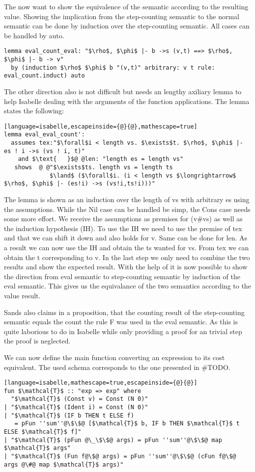 The now want to show the equivalence of the semantic according to the resulting value. Showing the implication from the step-counting semantic to the normal semantic can be done by induction over the step-counting semantic. All cases can be handled by auto.
\begin{lstlisting}[language=isabelle,mathescape=true]
  lemma eval_count_eval: "$\rho$, $\phi$ |- b ->s (v,t) ==> $\rho$, $\phi$ |- b -> v"
  by (induction $\rho$ $\phi$ b "(v,t)" arbitrary: v t rule: eval_count.induct) auto
\end{lstlisting}

The other direction also is not difficult but needs an lengthy axiliary lemma to help Isabelle dealing with the arguments of the function applications. The lemma states the following:
\begin{lstlisting}[language=isabelle,escapeinside={@}{@},mathescape=true]
lemma eval_eval_count':
  assumes tex:"$\forall$i < length vs. $\exists$t. $\rho$, $\phi$ |- es ! i ->s (vs ! i, t)"
    and $\text{   }$@ @len: "length es = length vs"
   shows  @ @"$\exists$ts. length vs = length ts
             $\land$ ($\forall$i. (i < length vs $\longrightarrow$ $\rho$, $\phi$ |- (es!i) ->s (vs!i,ts!i)))"
\end{lstlisting}

The lemma is shown as an induction over the length of vs with arbitrary es using the assumptions.
While the Nil case can be handled be simp, the Cons case needs some more effort.
We receive the assumptions as premises for (v\#vs) as well as the induction hypothesis (IH).
To use the IH we need to use the premise of tex and that we can shift it down and also holds for v. Same can be done for len.
As a result we can now use the IH and obtain the ts wanted for vs.
From tex we can obtain the t corresponding to v.
In the last step we only need to combine the two results and show the expected result. With the help of it is now possible to show the direction from eval semantic to step-counting semantic by induction of the eval semantic. This gives us the equivalance of the two semantics according to the value result.

Sands also claims in a proposition, that the counting result of the step-counting semantic equals the count the rule F was used in the eval semantic.
As this is quite laborious to do in Isabelle while only providing a proof for an trivial step the proof is neglected.

We can now define the main function converting an expression to its cost equivalent. The used schema corresponds to the one presented in \#TODO.
\begin{lstlisting}[language=isabelle,mathescape=true,escapeinside={@}{@}]
fun $\mathcal{T}$ :: "exp => exp" where
  "$\mathcal{T}$ (Const v) = Const (N 0)"
| "$\mathcal{T}$ (Ident i) = Const (N 0)"
| "$\mathcal{T}$ (IF b THEN t ELSE f)
   = pFun ''sum''@\$\$@ [$\mathcal{T}$ b, IF b THEN $\mathcal{T}$ t ELSE $\mathcal{T}$ f]"
| "$\mathcal{T}$ (pFun @\_\$\$@ args) = pFun ''sum''@\$\$@ map $\mathcal{T}$ args"
| "$\mathcal{T}$ (Fun f@\$@ args) = pFun ''sum''@\$\$@ (cFun f@\$@ args @\#@ map $\mathcal{T}$ args)"
\end{lstlisting}


